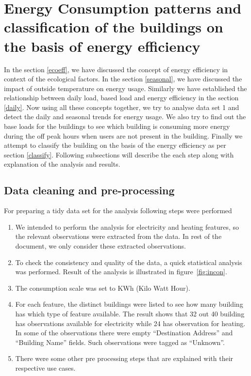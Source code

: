 \section{Energy Consumption patterns and classification of the buildings on the basis of energy efficiency}
In the section \ref{ecoeff}, we have discussed the concept of energy efficiency in context of the ecological factors. In the section \ref{seasonal}, we have discussed the impact of outside temperature on energy usage. Similarly we have established the relationship between daily load, based load and energy efficiency in the section \ref{daily}. Now using all these concepts together, we try to analyse data set 1 and detect the daily and seasonal trends for energy usage. We also try to find out the base loads for the buildings to see which building is consuming more energy during the off peak hours when users are not present in the building. Finally we attempt to classify the building on the basis of the energy efficiency as per section \ref{classify}. Following subsections will describe the each step along with explanation of the analysis and results.
\subsection{Data cleaning and pre-processing} \label{cleaning}
For preparing a tidy data set for the analysis following steps were performed
\begin{enumerate}
\item We intended to perform the analysis for electricity and heating features, so the relevant observations were extracted from the data. In rest of the document, we only consider these extracted observations.
\item To check the consistency and quality of the data, a quick statistical analysis was performed. Result of the analysis is illustrated in figure~\ref{fig:incon}.
\item The consumption scale was set to KWh (Kilo Watt Hour).
\item For each feature, the distinct buildings were listed to see how many building has which type of feature available. The result shows that 32 out 40 building has observations available for electricity while 24 has observation for heating. In some of the observations there were empty ``Destination Address'' and ``Building Name'' fields. Such observations were tagged as ``Unknown''. 
\item There were some other pre processing steps that are explained with their respective use cases.
\end{enumerate}

